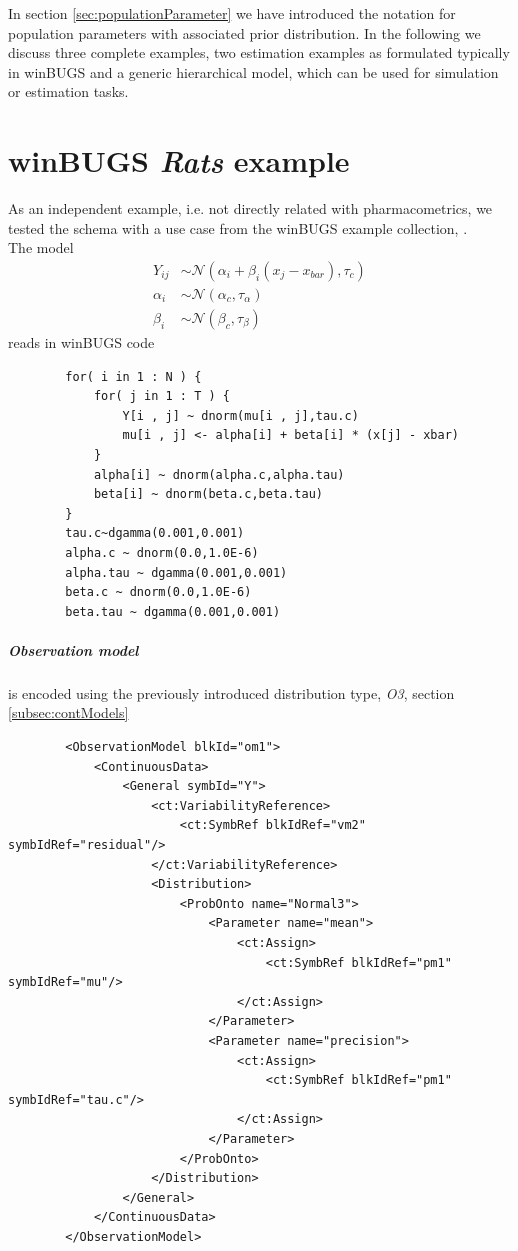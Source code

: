 In section \ref{sec:populationParameter} we have introduced the notation
for population parameters with associated prior distribution. In the following 
we discuss three complete examples, two estimation examples as formulated 
typically in winBUGS and a generic hierarchical model, which can be used
for simulation or estimation tasks.

\section{winBUGS \emph{Rats} example}
As an independent example, i.e. not directly related with pharmacometrics,  
we tested the schema with a use case from the winBUGS example collection, 
\cite{winBUGSvol1}.\\
The model
\begin{align*}
Y_{ij} &\sim \mathcal{N}(\alpha_i + \beta_i (x_j - x_{bar}), \tau_c) \\ 
\alpha_i &\sim \mathcal{N}(\alpha_c,\tau_{\alpha}) \\
\beta_i &\sim \mathcal{N}(\beta_c,\tau_{\beta}) 
\end{align*}
reads in winBUGS code
\lstset{language=MLX}
\begin{lstlisting}
		for( i in 1 : N ) {
			for( j in 1 : T ) {
				Y[i , j] ~ dnorm(mu[i , j],tau.c)
				mu[i , j] <- alpha[i] + beta[i] * (x[j] - xbar)
			}
			alpha[i] ~ dnorm(alpha.c,alpha.tau)
			beta[i] ~ dnorm(beta.c,beta.tau)
		} 
		tau.c~dgamma(0.001,0.001)
		alpha.c ~ dnorm(0.0,1.0E-6)
		alpha.tau ~ dgamma(0.001,0.001)
		beta.c ~ dnorm(0.0,1.0E-6)
		beta.tau ~ dgamma(0.001,0.001)
\end{lstlisting} 
\subparagraph{Observation model} is encoded using the previously introduced 
distribution type, \emph{O3}, section \ref{subsec:contModels}
\lstset{language=XML}
\begin{lstlisting}
        <ObservationModel blkId="om1">
            <ContinuousData>
                <General symbId="Y">
                    <ct:VariabilityReference>
                        <ct:SymbRef blkIdRef="vm2" symbIdRef="residual"/>
                    </ct:VariabilityReference>
                    <Distribution>
                        <ProbOnto name="Normal3">
                            <Parameter name="mean">
                                <ct:Assign>
                                    <ct:SymbRef blkIdRef="pm1" symbIdRef="mu"/>
                                </ct:Assign>
                            </Parameter>
                            <Parameter name="precision">
                                <ct:Assign>
                                    <ct:SymbRef blkIdRef="pm1" symbIdRef="tau.c"/>
                                </ct:Assign>
                            </Parameter>
                        </ProbOnto>
                    </Distribution>
                </General>
            </ContinuousData>
        </ObservationModel>
\end{lstlisting}
